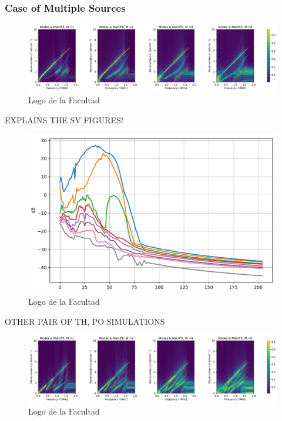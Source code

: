 \subsubsection{Case of Multiple Sources}
\begin{figure}[!h]
	\centering
	\includegraphics[width=\textwidth]{images/TimeMultSous/2DTimeS8P12ElasticFK10M780_y.pdf}
	\caption{Logo de la Facultad}
	\label{kldmalsda}
\end{figure}
EXPLAINS THE SV FIGURES!
\begin{figure}[!h]
	\centering
	\includegraphics[scale=.5]{images/TimeMultSous/2DTimeS8P12Elastic10_SV.pdf}
	\caption{Logo de la Facultad}
	\label{k765lsda}
\end{figure}
OTHER PAIR OF TH, PO SIMULATIONS
\begin{figure}[!h]
	\centering
	\includegraphics[width=\textwidth]{images/TimeMultSous/2DTimeS8P3ElasticFK28M780_y.pdf}
	\caption{Logo de la Facultad}
	\label{klyhu6sda}
\end{figure}

